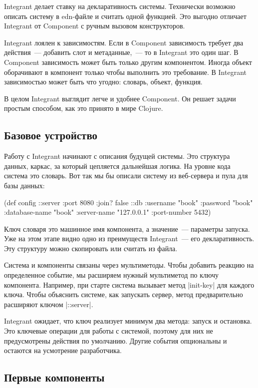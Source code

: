 Integrant делает ставку на декларативность системы. Технически возможно описать
систему в edn-файле и считать одной функцией. Это выгодно отличает Integrant от
Component с ручным вызовом конструкторов.

Integrant лоялен к зависимостям. Если в Component зависимость требует два
действия~--- добавить слот и метаданные,~--- то в Integrant это один шаг. В
Component зависимость может быть только другим компонентом. Иногда объект
оборачивают в компонент только чтобы выполнить это требование. В Integrant
зависимостью может быть что угодно: словарь, объект, функция.

В целом Integrant выглядит легче и удобнее Component. Он решает задачи простым
способом, как это принято в мире Clojure.

\subsection{Базовое устройство}

Работу с Integrant начинают с описания будущей системы. Это структура данных,
каркас, за который цепляется дальнейшая логика. На уровне кода система это
словарь. Вот так мы бы описали систему из веб-сервера и пула для базы данных:

\begin{code}
(def config
  {::server {:port 8080 :join? false}
   ::db {:username      "book"
         :password      "book"
         :database-name "book"
         :server-name   "127.0.0.1"
         :port-number   5432}})
\end{code}

Ключ словаря это машинное имя компонента, а значение~--- параметры запуска. Уже на
этом этапе видно одно из преимуществ Integrant~--- его декларативность. Эту
структуру можно скопировать или считать из файла.

Система и компоненты связаны через мультиметоды. Чтобы добавить реакцию на
определенное событие, мы расширяем нужный мультиметод по ключу
компонента. Например, при старте система вызывает метод \spverb|init-key| для каждого
ключа. Чтобы объяснить системе, как запускать сервер, метод предварительно
расширяют ключом \spverb|::server|.

Integrant ожидает, что ключ реализует минимум два метода: запуск и
остановка. Это ключевые операции для работы с системой, поэтому для них не
предусмотрены действия по умолчанию. Другие события опциональны и остаются на
усмотрение разработчика.

\subsection{Первые компоненты}

